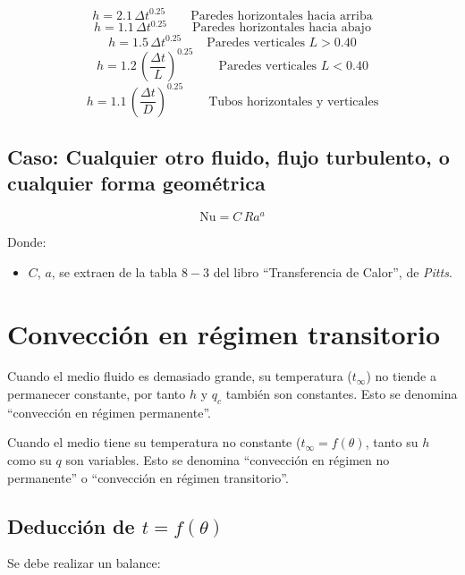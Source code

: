 \begin{equation}
    h = 2.1\,\Delta t^{0.25}\qquad\text{Paredes horizontales hacia arriba}
\end{equation}
\begin{equation}
    h = 1.1\,\Delta t^{0.25}\qquad\text{Paredes horizontales hacia abajo}
\end{equation}
\begin{equation}
    h = 1.5\,\Delta t^{0.25}\qquad\text{Paredes verticales } L > 0.40
\end{equation}
\begin{equation}
    h = 1.2\,\left(\frac{\Delta t}{L}\right)^{0.25}
    \qquad\text{Paredes verticales } L < 0.40
\end{equation}
\begin{equation}
    h = 1.1\,\left(\frac{\Delta t}{D}\right)^{0.25}
    \qquad\text{Tubos horizontales y verticales}
\end{equation}

\subsection{Caso: Cualquier otro fluido, flujo turbulento, o cualquier forma
geométrica}
\begin{equation}
    \text{Nu} = C\,Ra^a
\end{equation}

Donde:
\begin{itemize}
    \item $C$, $a$, se extraen de la tabla $8-3$ del libro ``Transferencia de
        Calor'', de \emph{Pitts}.
\end{itemize}

\section{Convección en régimen transitorio}
Cuando el medio fluido es demasiado grande, su temperatura ($t_\infty$) no
tiende a permanecer constante, por tanto $h$ y $q_c$ también son constantes.
Esto se denomina ``convección en régimen permanente''.

Cuando el medio tiene su temperatura no constante ($t_\infty = f(\theta)$, tanto
su $h$ como su $q$ son variables. Esto se denomina ``convección en régimen no
permanente'' o ``convección en régimen transitorio''.

\subsection{Deducción de $t = f(\theta)$}
Se debe realizar un balance:

